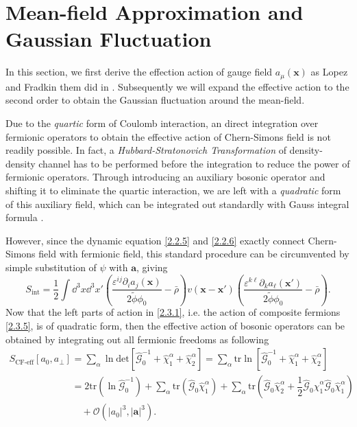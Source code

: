 \documentclass[bachelor,english,numbers]{ustcthesis}
\begin{document}
	\section{Mean-field Approximation and Gaussian Fluctuation}
		\indent\par In this section, we first derive the effection action of gauge field $a_\mu(\bm{x})$ as Lopez and Fradkin them did in \cite{lopez1991fractional}. Subsequently we will expand the effective action to the second order to obtain the Gaussian fluctuation around the mean-field.\par
		Due to the \emph{quartic} form of Coulomb interaction, an direct integration over fermionic operators to obtain the effective action of Chern-Simons field is not readily possible. In fact, a \emph{Hubbard-Stratonovich Transformation} of density-density channel has to be performed before the integration to reduce the power of fermionic operators. Through introducing an auxiliary bosonic operator and shifting it to eliminate the quartic interaction, we are left with a \emph{quadratic} form of this auxiliary field, which can be integrated out standardly with Gauss integral formula \cite{Stratonovich1957On,hubbard1959calculation,altland2010condensed}.\par
		However, since the dynamic equation \eqref{2.2.5} and \eqref{2.2.6} exactly connect Chern-Simons field with fermionic field, this standard procedure can be circumvented by simple substitution of $\psi$ with $\bm{a}$, giving
		\begin{equation}\label{2.4.1}
			S_{\text{int}}=\dfrac{1}{2}\int\dd^3 x\dd^3 x' \left(\dfrac{\varepsilon^{ij}\partial_i a_j(\bm{x})}{2\widetilde{\phi}\phi_0}-\bar{\rho}\right) v(\bm{x}-\bm{x'})\left(\dfrac{\varepsilon^{k\ell}\partial_k a_\ell(\bm{x'})}{2\widetilde{\phi}\phi_0}-\bar{\rho}\right).
		\end{equation}
		\indent Now that the left parts of action in \eqref{2.3.1}, i.e. the action of composite fermions \eqref{2.3.5}, is of quadratic form, then the effective action of bosonic operators can be obtained by integrating out all fermionic freedoms as following
		\begin{align}
			S_{\text{CF-eff}}[a_0,a_{\perp}]&=\sum_\alpha\ln\mathrm{det}\left[\hat{\mathcal{G}}_0^{-1}+\hat{\chi}^\alpha_1+\hat{\chi}^\alpha_2\right]=\sum_\alpha\mathrm{tr}\ln\left[\hat{\mathcal{G}}_0^{-1}+\hat{\chi}^\alpha_1+\hat{\chi}^\alpha_2\right]\nonumber\\
			&=2\mathrm{tr}\left(\ln\hat{\mathcal{G}}_0^{-1}\right)+\sum_\alpha\mathrm{tr}\left(\hat{\mathcal{G}}_0\hat{\chi}^\alpha_1\right)+\sum_\alpha\mathrm{tr}\left(\hat{\mathcal{G}}_0\hat{\chi}^\alpha_2+\dfrac{1}{2}\hat{\mathcal{G}}_0\hat{\chi}^\alpha_1\hat{\mathcal{G}}_0\hat{\chi}^\alpha_1\right)\nonumber\\
			&\quad+\mathcal{O}(|a_0|^3,|\bm{a}|^3).\label{2.4.2}
		\end{align}
\end{document}
